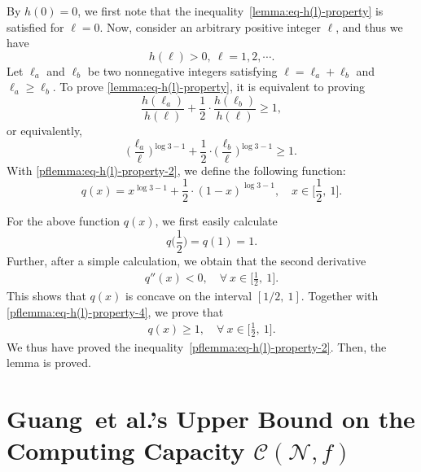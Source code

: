 \documentclass[11pt,draftclsnofoot,onecolumn]{IEEEtran}
\begin{document}
By $h(0)=0$, we first note that the inequality~\eqref{lemma:eq-h(l)-property} is satisfied for $\ell=0$. Now, consider an arbitrary positive integer $\ell$, and thus we have $$h(\ell)>0,~\ell=1,2,\cdots.$$
Let  $\ell_a$ and $\ell_b$ be two nonnegative integers satisfying
 $\ell=\ell_a+\ell_b$ and $\ell_a\geq\ell_b$. To prove \eqref{lemma:eq-h(l)-property}, it is equivalent to proving
\begin{equation*}
\frac{h(\ell_a)}{h(\ell)}+\frac{1}{2}\cdot\frac{h(\ell_b)}{h(\ell)}\geq 1,\label{pflemma:eq-h(l)-property-1}
\end{equation*}
or equivalently,
\begin{equation}
\Big(\frac{\ell_a}{\ell}\Big)^{\log3-1}+\frac{1}{2}\cdot\Big(\frac{\ell_b}{\ell}\Big)^{\log3-1}\geq 1.\label{pflemma:eq-h(l)-property-2}
\end{equation}
With \eqref{pflemma:eq-h(l)-property-2}, we define the following function:
 \begin{equation*}
 q(x)= x^{\log3-1}+\frac{1}{2}\cdot (1-x)^{\log3-1},\quad x\in\Big[\dfrac{1}{2},~1\Big].\label{pflemma:eq-h(l)-property-3}
 \end{equation*}

 For the above function $q(x)$, we first easily calculate
 \begin{equation}
 q\Big(\frac{1}{2}\Big)=q(1)=1.\label{pflemma:eq-h(l)-property-4}
 \end{equation}
 Further, after a simple calculation, we obtain that  the second derivative
 \begin{align*}
 q''(x)<0,\quad\forall~x\in\Big[\frac{1}{2},~1\Big].
 \end{align*}
 This shows that $q(x)$ is concave on the interval $[1/2,~1]$. Together with \eqref{pflemma:eq-h(l)-property-4}, we prove that
 \begin{align}
 q(x)\geq 1,\quad\forall~x\in\Big[\frac{1}{2},~1\Big].\nonumber
 \end{align}
 We thus have proved the inequality~\eqref{pflemma:eq-h(l)-property-2}. Then, the lemma is proved.

\section{Guang~et al.'s Upper Bound on the Computing Capacity $\mathcal{C}(\mathcal{N},f)$}\label{appendix:GYYB-bound-intro_and_com}
\end{document}
